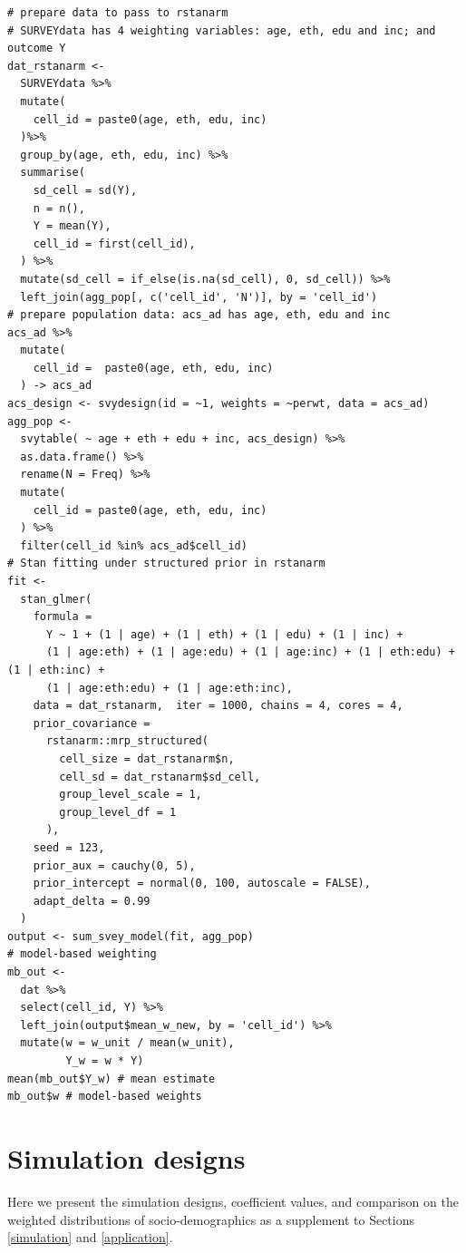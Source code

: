 \documentclass[11pt]{article}
\numberwithin{figure}{section}
\numberwithin{table}{section}
\numberwithin{equation}{section}
\begin{document}
\begin{small}
\begin{verbatim}
# prepare data to pass to rstanarm
# SURVEYdata has 4 weighting variables: age, eth, edu and inc; and outcome Y
dat_rstanarm <-
  SURVEYdata %>%
  mutate(
    cell_id = paste0(age, eth, edu, inc)
  )%>% 
  group_by(age, eth, edu, inc) %>%
  summarise(
    sd_cell = sd(Y),
    n = n(),
    Y = mean(Y),
    cell_id = first(cell_id),
  ) %>%
  mutate(sd_cell = if_else(is.na(sd_cell), 0, sd_cell)) %>%
  left_join(agg_pop[, c('cell_id', 'N')], by = 'cell_id')
# prepare population data: acs_ad has age, eth, edu and inc
acs_ad %>% 
  mutate(
    cell_id =  paste0(age, eth, edu, inc)
  ) -> acs_ad
acs_design <- svydesign(id = ~1, weights = ~perwt, data = acs_ad)
agg_pop <- 
  svytable( ~ age + eth + edu + inc, acs_design) %>% 
  as.data.frame() %>%
  rename(N = Freq) %>%
  mutate(
    cell_id = paste0(age, eth, edu, inc) 
  ) %>%
  filter(cell_id %in% acs_ad$cell_id)
# Stan fitting under structured prior in rstanarm
fit <-
  stan_glmer(
    formula = 
      Y ~ 1 + (1 | age) + (1 | eth) + (1 | edu) + (1 | inc) +
      (1 | age:eth) + (1 | age:edu) + (1 | age:inc) + (1 | eth:edu) + (1 | eth:inc) + 
      (1 | age:eth:edu) + (1 | age:eth:inc),
    data = dat_rstanarm,  iter = 1000, chains = 4, cores = 4,
    prior_covariance = 
      rstanarm::mrp_structured(
        cell_size = dat_rstanarm$n, 
        cell_sd = dat_rstanarm$sd_cell, 
        group_level_scale = 1,
        group_level_df = 1
      ),
    seed = 123,
    prior_aux = cauchy(0, 5),
    prior_intercept = normal(0, 100, autoscale = FALSE), 
    adapt_delta = 0.99
  )
output <- sum_svey_model(fit, agg_pop)
# model-based weighting
mb_out <-
  dat %>%
  select(cell_id, Y) %>%
  left_join(output$mean_w_new, by = 'cell_id') %>%
  mutate(w = w_unit / mean(w_unit),
         Y_w = w * Y)
mean(mb_out$Y_w) # mean estimate
mb_out$w # model-based weights
\end{verbatim}
\end{small}

\pagebreak

\section{Simulation designs}
\label{appendix}

Here we present the simulation designs, coefficient values, and comparison on the weighted distributions of socio-demographics as a supplement to Sections \ref{simulation} and \ref{application}.
\end{document}
